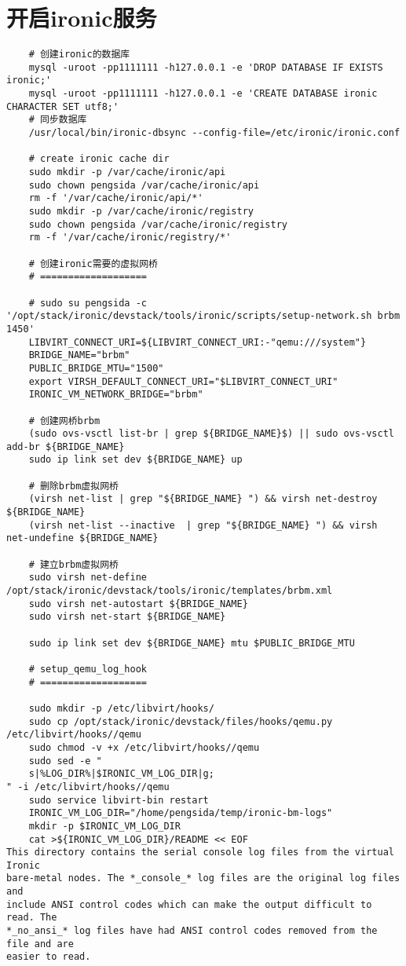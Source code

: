 \documentclass[a4paper,left=1.5cm,right=1.5cm,11pt]{article}
\begin{document}
\section{开启ironic服务}
	\begin{lstlisting}
	# 创建ironic的数据库
	mysql -uroot -pp1111111 -h127.0.0.1 -e 'DROP DATABASE IF EXISTS ironic;'
	mysql -uroot -pp1111111 -h127.0.0.1 -e 'CREATE DATABASE ironic CHARACTER SET utf8;'
	# 同步数据库
	/usr/local/bin/ironic-dbsync --config-file=/etc/ironic/ironic.conf

	# create ironic cache dir
	sudo mkdir -p /var/cache/ironic/api
    sudo chown pengsida /var/cache/ironic/api
    rm -f '/var/cache/ironic/api/*'
    sudo mkdir -p /var/cache/ironic/registry
    sudo chown pengsida /var/cache/ironic/registry
    rm -f '/var/cache/ironic/registry/*'

	# 创建ironic需要的虚拟网桥
	# ===================
	
	# sudo su pengsida -c '/opt/stack/ironic/devstack/tools/ironic/scripts/setup-network.sh brbm 1450'
	LIBVIRT_CONNECT_URI=${LIBVIRT_CONNECT_URI:-"qemu:///system"}
	BRIDGE_NAME="brbm"
	PUBLIC_BRIDGE_MTU="1500"
	export VIRSH_DEFAULT_CONNECT_URI="$LIBVIRT_CONNECT_URI"
	IRONIC_VM_NETWORK_BRIDGE="brbm"

	# 创建网桥brbm
	(sudo ovs-vsctl list-br | grep ${BRIDGE_NAME}$) || sudo ovs-vsctl add-br ${BRIDGE_NAME}
	sudo ip link set dev ${BRIDGE_NAME} up

	# 删除brbm虚拟网桥
	(virsh net-list | grep "${BRIDGE_NAME} ") && virsh net-destroy ${BRIDGE_NAME}
	(virsh net-list --inactive  | grep "${BRIDGE_NAME} ") && virsh net-undefine ${BRIDGE_NAME}

	# 建立brbm虚拟网桥
	sudo virsh net-define /opt/stack/ironic/devstack/tools/ironic/templates/brbm.xml
	sudo virsh net-autostart ${BRIDGE_NAME}
	sudo virsh net-start ${BRIDGE_NAME}

	sudo ip link set dev ${BRIDGE_NAME} mtu $PUBLIC_BRIDGE_MTU
	
	# setup_qemu_log_hook
	# ===================

	sudo mkdir -p /etc/libvirt/hooks/
    sudo cp /opt/stack/ironic/devstack/files/hooks/qemu.py /etc/libvirt/hooks//qemu
    sudo chmod -v +x /etc/libvirt/hooks//qemu
	sudo sed -e "
	s|%LOG_DIR%|$IRONIC_VM_LOG_DIR|g;
" -i /etc/libvirt/hooks//qemu
	sudo service libvirt-bin restart
	IRONIC_VM_LOG_DIR="/home/pengsida/temp/ironic-bm-logs"
    mkdir -p $IRONIC_VM_LOG_DIR
    cat >${IRONIC_VM_LOG_DIR}/README << EOF
This directory contains the serial console log files from the virtual Ironic
bare-metal nodes. The *_console_* log files are the original log files and
include ANSI control codes which can make the output difficult to read. The
*_no_ansi_* log files have had ANSI control codes removed from the file and are
easier to read.


\end{lstlisting}
\end{document}
